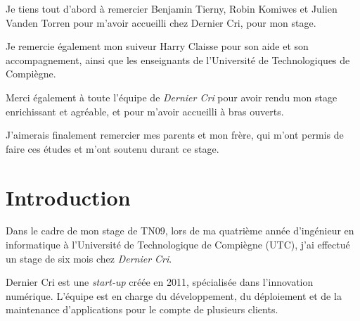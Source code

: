 \documentclass[12pt,a4paper]{article}
\begin{document}
  Je tiens tout d'abord à remercier Benjamin Tierny, Robin Komiwes et
  Julien Vanden Torren pour m'avoir accueilli chez Dernier Cri, pour mon
  stage.

  \bigskip

  Je remercie également mon suiveur Harry Claisse pour son aide et son
  accompagnement, ainsi que les enseignants de l'Université de
  Technologiques de Compiègne.

  \bigskip

  Merci également à toute l'équipe de \emph{Dernier Cri} pour avoir rendu
  mon stage enrichissant et agréable, et pour m'avoir accueilli à bras
  ouverts.

  \bigskip

  J'aimerais finalement remercier mes parents et mon frère, qui m'ont
  permis de faire ces études et m'ont soutenu durant ce stage.

  \newpage

  \section{Introduction}\label{introduction}

  \bigskip

  Dans le cadre de mon stage de TN09, lors de ma quatrième année
  d'ingénieur en informatique à l'Université de Technologique de Compiègne
  (UTC), j'ai effectué un stage de six mois chez \emph{Dernier Cri}.

  \bigskip

  Dernier Cri est une \emph{start-up} créée en 2011, spécialisée dans
  l'innovation numérique. L'équipe est en charge du développement, du
  déploiement et de la maintenance d'applications pour le compte de
  plusieurs clients.
\end{document}
